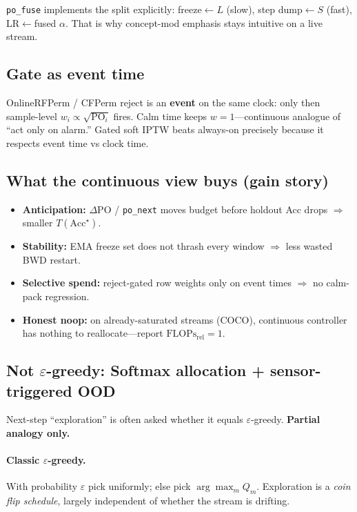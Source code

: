 \documentclass[11pt]{article}
\newcommand{\PO}{\mathrm{PO}}
\newcommand{\Flops}{\mathrm{FLOPs}_{\mathrm{rel}}}
\newcommand{\Acc}{\mathrm{Acc}}
\begin{document}
\texttt{po\_fuse} implements the split explicitly:
freeze$\leftarrow L$ (slow), step dump$\leftarrow S$ (fast),
LR$\leftarrow$fused $\alpha$.
That is why concept-mod emphasis stays intuitive on a live stream.

\subsection{Gate as event time}
OnlineRFPerm / CFPerm reject is an \textbf{event} on the same clock:
only then sample-level $w_i\propto\sqrt{\PO_i}$ fires.
Calm time keeps $w=1$---continuous analogue of ``act only on alarm.''
Gated soft IPTW beats always-on precisely because it respects event
time vs clock time.

\subsection{What the continuous view buys (gain story)}
\begin{itemize}[leftmargin=1.2em,itemsep=2pt]
  \item \textbf{Anticipation:} $\Delta\PO$ / \texttt{po\_next} moves
        budget before holdout Acc drops $\Rightarrow$ smaller
        $T(\Acc^\star)$.
  \item \textbf{Stability:} EMA freeze set does not thrash every window
        $\Rightarrow$ less wasted BWD restart.
  \item \textbf{Selective spend:} reject-gated row weights only on
        event times $\Rightarrow$ no calm-pack regression.
  \item \textbf{Honest noop:} on already-saturated streams (COCO),
        continuous controller has nothing to reallocate---report
        $\Flops=1$.
\end{itemize}

\subsection{Not $\varepsilon$-greedy: Softmax allocation + sensor-triggered OOD}
\label{sec:eps}
Next-step ``exploration'' is often asked whether it equals
$\varepsilon$-greedy.
\textbf{Partial analogy only.}

\paragraph{Classic $\varepsilon$-greedy.}
With probability $\varepsilon$ pick uniformly; else pick
$\arg\max_m Q_m$.
Exploration is a \emph{coin flip schedule}, largely independent of
whether the stream is drifting.
\end{document}
